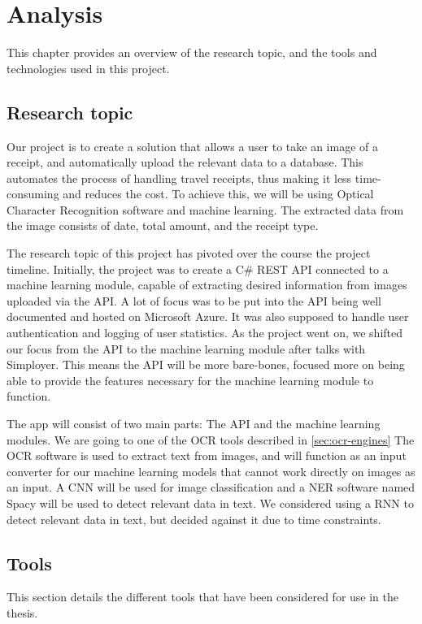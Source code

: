 \cleardoublepage
\chapter{Analysis}
\label{ch:analysis}
This chapter provides an overview of the research topic, and the tools and technologies used in this project.

\section{Research topic}\label{sec:research-topic}
Our project is to create a solution that allows a user to take an image of a receipt, and automatically upload the
relevant data to a database.
This automates the process of handling travel receipts, thus making it less time-consuming and reduces the cost.
To achieve this, we will be using Optical Character Recognition software and machine learning\@.
The extracted data from the image consists of date, total amount, and the receipt type.

The research topic of this project has pivoted over the course the project timeline.
Initially, the project was to create a C\# REST API connected to a machine learning module, capable of extracting desired information from images uploaded via the API.
A lot of focus was to be put into the API being well documented and hosted on Microsoft Azure.
It was also supposed to handle user authentication and logging of user statistics.
As the project went on, we shifted our focus from the API to the machine learning module after talks with Simployer.
This means the API will be more bare-bones, focused more on being able to provide the features necessary for the machine learning module to function.

The app will consist of two main parts: The API and the machine learning modules.
We are going to one of the OCR tools described in \ref{sec:ocr-engines}
The OCR software is used to extract text from images, and will function as an input converter for our machine learning models that cannot work directly on images as an input.
A CNN will be used for image classification and a NER software named Spacy will be used to detect relevant data in text.
We considered using a RNN to detect relevant data in text, but decided against it due to time constraints.

\section{Tools}\label{sec:tools}
This section details the different tools that have been considered for use in the thesis.
